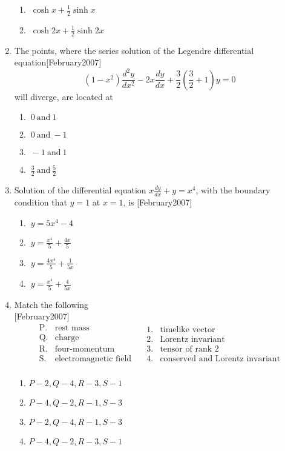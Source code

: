 \documentclass[journal]{IEEEtran}
\begin{document}
\begin{enumerate}
\begin{enumerate}
\item $\ \cosh x + \frac{1}{2}\sinh x$
\item $\ \cosh 2x + \frac{1}{2}\sinh 2x$
\end{enumerate}
\item The points, where the series solution of the Legendre differential equation\hfill[February2007]
\[
(1 - x^2)\frac{d^2 y}{dx^2} - 2x\frac{dy}{dx} + \frac{3}{2}\left(\frac{3}{2}+1\right)y = 0 
\]
will diverge, are located at
\begin{enumerate}
\item $ \ 0 \ \text{and} \ 1$
\item $ \ 0 \ \text{and} \ -1$
\item $ \ -1 \ \text{and} \ 1$
\item $ \ \frac{3}{2} \ \text{and} \ \frac{5}{2} $
\end{enumerate}
\newpage
\item Solution of the differential equation $ x \frac{dy}{dx} + y = x^4 $, with the boundary condition that $ y = 1 $ at  $x = 1$, is \hfill[February2007]
\begin{enumerate}
\item $ \ y = 5x^4 - 4$
\item $\ y = \frac{x^4}{5} + \frac{4x}{5} $
\item $ \ y = \frac{4x^4}{5} + \frac{1}{5x} $
\item $\ y = \frac{x^4}{5} + \frac{4}{5x} $
\end{enumerate} 
\item Match the following \\ \hfill[February2007] \[
\begin{array}{cl}
\text{P.} & \text{rest mass} \\
\text{Q.} & \text{charge} \\
\text{R.} & \text{four-momentum} \\
\text{S.} & \text{electromagnetic field} \\
\end{array}
\quad
\begin{array}{cl}
1. & \text{timelike vector} \\
2. & \text{Lorentz invariant} \\
3. & \text{tensor of rank 2} \\
4. & \text{conserved and Lorentz invariant} \\
\end{array}
\]
\begin{enumerate}
    \item $P-2,Q-4,R-3,S-1$
    \item $P-4,Q-2,R-1,S-3$
    \item $P-2,Q-4,R-1,S-3$
    \item $P-4,Q-2,R-3,S-1$
    \end{enumerate}


\end{enumerate}
\end{document}

